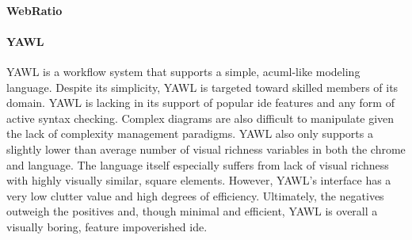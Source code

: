 \paragraph{WebRatio}

\paragraph{YAWL} YAWL is a workflow system that supports a simple, ac{uml}-like
modeling language. Despite its simplicity, YAWL is targeted toward skilled
members of its domain. YAWL is lacking in its support of popular \ac{ide}
features and any form of active syntax checking. Complex diagrams are also
difficult to manipulate given the lack of complexity management paradigms.
YAWL also only supports a slightly lower than average number of visual
richness variables in both the chrome and language. The language itself
especially suffers from lack of visual richness with highly visually
similar, square elements. However, YAWL's interface has a very low clutter
value and high degrees of efficiency. Ultimately, the negatives outweigh
the positives and, though minimal and efficient, YAWL is overall a visually
boring, feature impoverished \ac{ide}.
